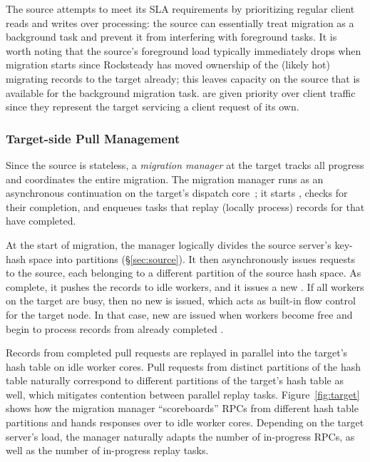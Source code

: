 The source attempts to meet its SLA requirements by prioritizing regular client
reads and writes over \pull processing: the source can essentially treat
migration as a background task and prevent it from interfering with foreground
tasks. It is worth noting that the source's foreground load typically
immediately drops when migration starts since Rocksteady has moved
ownership of the (likely hot) migrating records to the target already; this
leaves capacity on the source that is available for the background migration
task. \priopulls are given priority over client traffic since they
represent the target servicing a client request of its own.


\subsubsection{Target-side Pull Management}

Since the source is stateless, a {\em migration manager} at the target tracks
all progress and coordinates the entire migration.  The migration manager runs
as an asynchronous continuation on the target's dispatch
core~\cite{stutsman:dcft}; it starts \pulls, checks for their
completion, and enqueues tasks that replay (locally process) records for \pulls
that have completed.

At the start of migration, the manager logically divides the source
server's key-hash
space into partitions (\S\ref{sec:source}). It then asynchronously issues
\pull requests to the source, each belonging to a different partition of the
source hash space. As \pulls complete, it pushes the records to idle workers,
and it issues a new \pull. If all workers on the target are busy, then
no new \pull is issued, which acts as built-in flow control
for the target node. In that case, new \pulls are issued when workers become
free and begin to process records from already completed \pulls.

Records from completed pull requests are replayed in parallel into the
target's hash table on idle worker cores.  Pull requests from distinct
partitions of the hash table naturally correspond to different partitions of
the target's hash table as well, which mitigates contention between parallel
replay tasks.
Figure~\ref{fig:target} shows how the
migration manager ``scoreboards'' \pull RPCs from different hash table partitions and
hands responses over to idle worker cores.
Depending on the target server's load, the manager naturally
adapts the number of in-progress \pull RPCs, as well as the number of
in-progress replay tasks.

